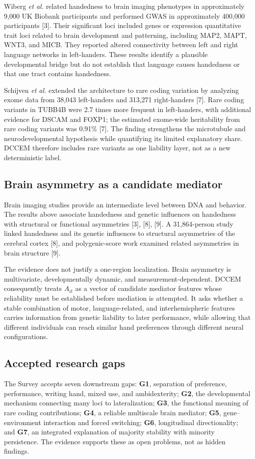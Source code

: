 \documentclass[10pt,conference]{IEEEtran}
\begin{document}
Wiberg \textit{et al.} related handedness to brain imaging phenotypes in approximately 9,000 UK Biobank participants and performed GWAS in approximately 400,000 participants [3]. Their significant loci included genes or expression quantitative trait loci related to brain development and patterning, including MAP2, MAPT, WNT3, and MICB. They reported altered connectivity between left and right language networks in left-handers. These results identify a plausible developmental bridge but do not establish that language causes handedness or that one tract contains handedness.

Schijven \textit{et al.} extended the architecture to rare coding variation by analyzing exome data from 38,043 left-handers and 313,271 right-handers [7]. Rare coding variants in TUBB4B were 2.7 times more frequent in left-handers, with additional evidence for DSCAM and FOXP1; the estimated exome-wide heritability from rare coding variants was 0.91\% [7]. The finding strengthens the microtubule and neurodevelopmental hypothesis while quantifying its limited explanatory share. DCCEM therefore includes rare variants as one liability layer, not as a new deterministic label.

\subsection{Brain asymmetry as a candidate mediator}
Brain imaging studies provide an intermediate level between DNA and behavior. The results above associate handedness and genetic influences on handedness with structural or functional asymmetries [3], [8], [9]. A 31,864-person study linked handedness and its genetic influences to structural asymmetries of the cerebral cortex [8], and polygenic-score work examined related asymmetries in brain structure [9].

The evidence does not justify a one-region localization. Brain asymmetry is multivariate, developmentally dynamic, and measurement-dependent. DCCEM consequently treats $A_{it}$ as a vector of candidate mediator features whose reliability must be established before mediation is attempted. It asks whether a stable combination of motor, language-related, and interhemispheric features carries information from genetic liability to later performance, while allowing that different individuals can reach similar hand preferences through different neural configurations.

\subsection{Accepted research gaps}
The Survey accepts seven downstream gaps: \textbf{G1}, separation of preference, performance, writing hand, mixed use, and ambidexterity; \textbf{G2}, the developmental mechanism connecting many loci to lateralization; \textbf{G3}, the functional meaning of rare coding contributions; \textbf{G4}, a reliable multiscale brain mediator; \textbf{G5}, gene--environment interaction and forced switching; \textbf{G6}, longitudinal directionality; and \textbf{G7}, an integrated explanation of majority stability with minority persistence. The evidence supports these as open problems, not as hidden findings.
\end{document}
